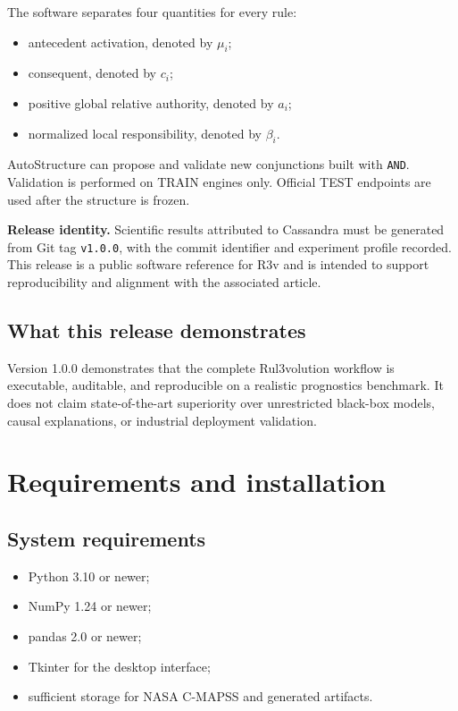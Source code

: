 \documentclass[11pt,a4paper]{article}
\begin{document}
The software separates four quantities for every rule:

\begin{itemize}
  \item antecedent activation, denoted by $\mu_i$;
  \item consequent, denoted by $c_i$;
  \item positive global relative authority, denoted by $a_i$;
  \item normalized local responsibility, denoted by $\beta_i$.
\end{itemize}

AutoStructure can propose and validate new conjunctions built with \texttt{AND}.
Validation is performed on TRAIN engines only. Official TEST endpoints are used
after the structure is frozen.

\begin{importantbox}
\textbf{Release identity.} Scientific results attributed to Cassandra must be
generated from Git tag \texttt{v1.0.0}, with the commit identifier and experiment
profile recorded. This release is a public software reference for R3v and is intended to support
reproducibility and alignment with the associated article.
\end{importantbox}

\subsection{What this release demonstrates}

Version 1.0.0 demonstrates that the complete Rul3volution workflow is executable,
auditable, and reproducible on a realistic prognostics benchmark. It does not
claim state-of-the-art superiority over unrestricted black-box models, causal
explanations, or industrial deployment validation.

\section{Requirements and installation}

\subsection{System requirements}

\begin{itemize}
  \item Python 3.10 or newer;
  \item NumPy 1.24 or newer;
  \item pandas 2.0 or newer;
  \item Tkinter for the desktop interface;
  \item sufficient storage for NASA C-MAPSS and generated artifacts.
\end{itemize}
\end{document}
